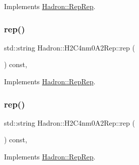 Implements \mbox{\hyperlink{structHadron_1_1RepRep_ab3213025f6de249f7095892109575fde}{Hadron\+::\+Rep\+Rep}}.

\mbox{\label{structHadron_1_1H2C4nm0A2Rep_acf769194280e756693be59efab932c8d}} 
\subsubsection{\texorpdfstring{rep()}{rep()}\hspace{0.1cm}{\footnotesize\ttfamily [2/5]}}
{\footnotesize\ttfamily std\+::string Hadron\+::\+H2\+C4nm0\+A2\+Rep\+::rep (\begin{DoxyParamCaption}{ }\end{DoxyParamCaption}) const\hspace{0.3cm}{\ttfamily [inline]}, {\ttfamily [virtual]}}



Implements \mbox{\hyperlink{structHadron_1_1RepRep_ab3213025f6de249f7095892109575fde}{Hadron\+::\+Rep\+Rep}}.

\mbox{\label{structHadron_1_1H2C4nm0A2Rep_acf769194280e756693be59efab932c8d}} 
\subsubsection{\texorpdfstring{rep()}{rep()}\hspace{0.1cm}{\footnotesize\ttfamily [3/5]}}
{\footnotesize\ttfamily std\+::string Hadron\+::\+H2\+C4nm0\+A2\+Rep\+::rep (\begin{DoxyParamCaption}{ }\end{DoxyParamCaption}) const\hspace{0.3cm}{\ttfamily [inline]}, {\ttfamily [virtual]}}



Implements \mbox{\hyperlink{structHadron_1_1RepRep_ab3213025f6de249f7095892109575fde}{Hadron\+::\+Rep\+Rep}}.

\mbox{\label{structHadron_1_1H2C4nm0A2Rep_acf769194280e756693be59efab932c8d}} 
